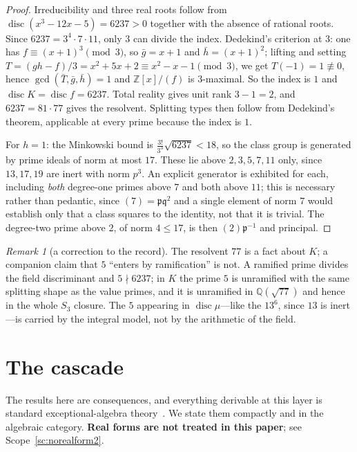 \documentclass[11pt,reqno]{amsart}
\theoremstyle{plain}
\theoremstyle{definition}
\theoremstyle{remark}
\newtheorem{remark}[theorem]{Remark}
\newcommand{\Q}{\mathbb{Q}}
\newcommand{\Z}{\mathbb{Z}}
\newcommand{\disc}{\operatorname{disc}}
\begin{document}
\begin{proof}
Irreducibility and three real roots follow from $\disc(x^3-12x-5)=6237>0$ together with
the absence of rational roots. Since $6237=3^4\cdot7\cdot11$, only $3$ can divide the
index. Dedekind's criterion at $3$: one has $f\equiv(x+1)^3\pmod3$, so $\bar g=x+1$ and
$\bar h=(x+1)^2$; lifting and setting $T=(gh-f)/3=x^2+5x+2\equiv x^2-x-1\pmod3$, we get
$T(-1)=1\not\equiv0$, hence $\gcd(\bar T,\bar g,\bar h)=1$ and $\Z[x]/(f)$ is
$3$-maximal. So the index is $1$ and $\disc K=\disc f=6237$. Total reality gives unit
rank $3-1=2$, and $6237=81\cdot77$ gives the resolvent. Splitting types then follow from
Dedekind's theorem, applicable at every prime because the index is $1$.

For $h=1$: the Minkowski bound is $\frac{3!}{3^3}\sqrt{6237}<18$, so the class group is
generated by prime ideals of norm at most $17$. These lie above $2,3,5,7,11$ only, since
$13,17,19$ are inert with norm $p^3$. An explicit generator is exhibited for each,
including \emph{both} degree-one primes above $7$ and both above $11$; this is necessary
rather than pedantic, since $(7)=\mathfrak p\mathfrak q^2$ and a single element of norm
$7$ would establish only that a class squares to the identity, not that it is trivial.
The degree-two prime above $2$, of norm $4\le17$, is then $(2)\mathfrak p^{-1}$ and
principal.
\end{proof}

\begin{remark}[a correction to the record]
The resolvent $77$ is a fact about $K$; a companion claim that $5$ ``enters by
ramification'' is not. A ramified prime divides the field discriminant and
$5\nmid6237$; in $K$ the prime $5$ is unramified with the same splitting shape as the
value primes, and it is unramified in $\Q(\sqrt{77})$ and hence in the whole $S_3$
closure. The $5$ appearing in $\disc\mu$---like the $13^6$, since $13$ is inert---is
carried by the integral model, not by the arithmetic of the field.
\end{remark}

\section{The cascade}\label{sec:cascade}

The results here are consequences, and everything derivable at this layer is standard
exceptional-algebra theory~\cite{Slansky,BartonSudbery}. We state them compactly and in
the algebraic category. \textbf{Real forms are not treated in this paper}; see
Scope~\ref{sc:norealform2}.
\end{document}
